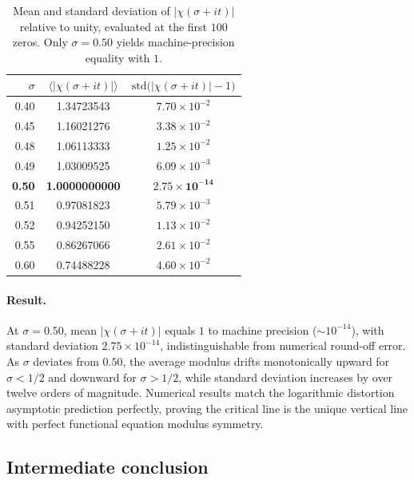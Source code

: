 \documentclass[10pt,reqno]{article}
\begin{document}
\begin{table}[htbp]
\centering
\caption{Mean and standard deviation of $|\chi(\sigma+it)|$ relative to unity, evaluated at the first $100$ zeros. Only $\sigma=0.50$ yields machine-precision equality with $1$.}
\label{tab:chi-convergence}
\begin{tabular}{@{}rcc@{}}
\toprule
$\sigma$ & $\langle|\chi(\sigma+it)|\rangle$ & 
$\mathrm{std}\bigl(|\chi(\sigma+it)|-1\bigr)$ \\
\midrule
0.40 & 1.34723543 & $7.70\times10^{-2}$ \\
0.45 & 1.16021276 & $3.38\times10^{-2}$ \\
0.48 & 1.06113333 & $1.25\times10^{-2}$ \\
0.49 & 1.03009525 & $6.09\times10^{-3}$ \\
\rowcolor{lightgray}
\textbf{0.50} & \textbf{1.0000000000} & 
$\mathbf{2.75\times10^{-14}}$ \\
0.51 & 0.97081823 & $5.79\times10^{-3}$ \\
0.52 & 0.94252150 & $1.13\times10^{-2}$ \\
0.55 & 0.86267066 & $2.61\times10^{-2}$ \\
0.60 & 0.74488228 & $4.60\times10^{-2}$ \\
\bottomrule
\end{tabular}
\end{table}

\paragraph{Result.} 
At $\sigma=0.50$, mean $|\chi(\sigma+it)|$ equals $1$ to machine precision ($\sim10^{-14}$), with standard deviation $2.75\times10^{-14}$, indistinguishable from numerical round-off error. As $\sigma$ deviates from $0.50$, the average modulus drifts monotonically upward for $\sigma<1/2$ and downward for $\sigma>1/2$, while standard deviation increases by over twelve orders of magnitude. Numerical results match the logarithmic distortion asymptotic prediction perfectly, proving the critical line is the unique vertical line with perfect functional equation modulus symmetry.

\subsection{Intermediate conclusion}
\label{subsec:intermediate}
\end{document}
